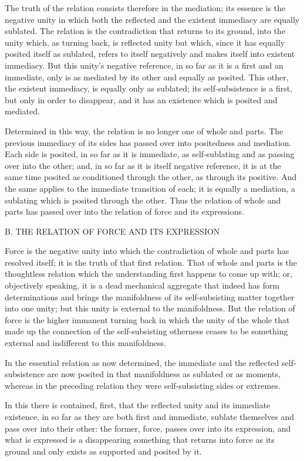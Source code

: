 The truth of the relation consists
therefore in the mediation;
its essence is the negative unity
in which both the reflected
and the existent immediacy
are equally sublated.
The relation is the contradiction
that returns to its ground,
into the unity which,
as turning back,
is reflected unity
but which, since it has
equally posited itself as sublated,
refers to itself negatively
and makes itself into existent immediacy.
But this unity's negative reference,
in so far as it is a first and an immediate,
only is as mediated by its other
and equally as posited.
This other, the existent immediacy,
is equally only as sublated;
its self-subsistence is a first,
but only in order to disappear,
and it has an existence
which is posited and mediated.

Determined in this way, the relation is
no longer one of whole and parts.
The previous immediacy of its sides has
passed over into positedness and mediation.
Each side is posited, in so far as it is immediate,
as self-sublating and as passing over into the other;
and, in so far as it is itself negative reference,
it is at the same time posited as conditioned
through the other, as through its positive.
And the same applies to the immediate transition of each;
it is equally a mediation, a sublating
which is posited through the other.
Thus the relation of whole and parts has passed over
into the relation of force and its expressions.

B. THE RELATION OF FORCE AND ITS EXPRESSION

Force is the negative unity into which
the contradiction of whole and parts has resolved itself;
it is the truth of that first relation.
That of whole and parts is the thoughtless relation
which the understanding first happens to come up with;
or, objectively speaking, it is a dead mechanical aggregate
that indeed has form determinations
and brings the manifoldness of
its self-subsisting matter together into one unity;
but this unity is external to the manifoldness.
But the relation of force is the higher immanent turning back
in which the unity of the whole that made up the connection
of the self-subsisting otherness ceases to be something external
and indifferent to this manifoldness.

In the essential relation as now determined,
the immediate and the reflected self-subsistence are
now posited in that manifoldness as sublated or as moments,
whereas in the preceding relation they were self-subsisting
sides or extremes.

In this there is contained,
first, that the reflected unity
and its immediate existence,
in so far as they are both first and immediate,
sublate themselves and pass over into their other:
the former, force, passes over into its expression,
and what is expressed is a disappearing something
that returns into force as its ground
and only exists as supported and posited by it.

